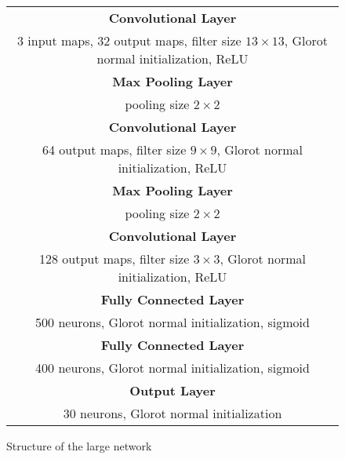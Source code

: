 \begin{figure}[h!]
	\scriptsize
	\centering
	\begin{tabular}{|c|}
	\hline
		\textbf{Convolutional Layer}\\
		3 input maps, 32 output maps, filter size $13\times13$, Glorot normal initialization, \ac{ReLU}\\
	\hline
		\textbf{Max Pooling Layer}\\
		pooling size $2\times2$\\
	\hline
		\textbf{Convolutional Layer}\\
		64 output maps, filter size $9\times9$, Glorot normal initialization, \ac{ReLU}\\
	\hline
		\textbf{Max Pooling Layer}\\
		pooling size $2\times2$\\
	\hline
		\textbf{Convolutional Layer}\\
		128 output maps, filter size $3\times3$, Glorot normal initialization, \ac{ReLU}\\
	\hline
		\textbf{Fully Connected Layer}\\
		500 neurons, Glorot normal initialization, sigmoid\\
	\hline
		\textbf{Fully Connected Layer}\\
		400 neurons, Glorot normal initialization, sigmoid\\
	\hline
		\textbf{Output Layer}\\
		30 neurons, Glorot normal initialization\\
	\hline
	\end{tabular}
	\caption{Structure of the large network}
	\label{fig:cnn_structure_largenet}
\end{figure}
